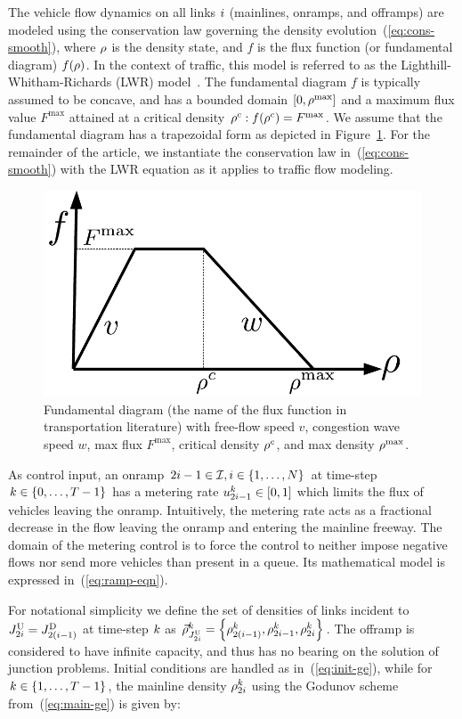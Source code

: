 The vehicle flow dynamics on all links $i$ (mainlines, onramps,
and offramps) are modeled using the conservation law governing the
density evolution~(\ref{eq:cons-smooth}), where $\rho$ is the
density state, and $f$ is the flux function (or fundamental diagram)
$f\left(\density\right)$. In the context of traffic, this model is
referred to as the Lighthill-Whitham-Richards (LWR) model~\cite{lighthill1955kinematic,richards1956shock}.
The fundamental diagram $f$ is typically assumed to be concave, and
has a bounded domain $\left[0,\density^{\max}\right]$ and a maximum
flux value $F^{\max}$ attained at a critical density $\density^{c}:f\left(\density^{c}\right)=F^{\max}$.
We assume that the fundamental diagram has a trapezoidal form as depicted
in Figure~\ref{fig:Fundamental-diagram-with}. For the remainder
of the article, we instantiate the conservation law in~(\ref{eq:cons-smooth})
with the LWR equation as it applies to traffic flow modeling.\begin{figure}%
\begin{centering}
\includegraphics[width=0.4\columnwidth]{figs-gen/fd}
\par\end{centering}

\caption{Fundamental diagram (the name of the flux function in transportation
literature) with free-flow speed $v$, congestion wave speed $w$,
max flux $F^{\max}$, critical density $\rho^{c}$, and max density
$\rho^{\max}$.\label{fig:Fundamental-diagram-with}}
\end{figure}%


As control input, an onramp $2\link-1\in\links,\link\in\intrange 1{\nlinks}$
at time-step $k\in\intrange 0{\ntime-1}$ has a metering rate $\ramp_{2\link-1}^{\tind}\in\left[0,1\right]$
which limits the flux of vehicles leaving the onramp. Intuitively,
the metering rate acts as a fractional decrease in the flow leaving
the onramp and entering the mainline freeway. The domain of the metering
control is to force the control to neither impose negative flows nor
send more vehicles than present in a queue. Its mathematical model
is expressed in~(\ref{eq:ramp-eqn}).

For notational simplicity we define the set of densities of links
incident to $\jup{2\link}=\jdown{2\left(\link-1\right)}$ at time-step
$k$ as $\juncstate{\jup{2\link}}{\tind}=\left\{ \discrete{2\left(\link-1\right)}{\tind},\discrete{2i-1}{\tind},\discrete{2\link}{\tind}\right\} $.
The offramp is considered to have infinite capacity, and thus has
no bearing on the solution of junction problems. Initial conditions
are handled as in~(\ref{eq:init-ge}), while for $k\in\intrange 1{\ntime-1}$,
the mainline density $\rho_{2i}^{k}$ using the Godunov
scheme from~(\ref{eq:main-ge}) is given by:

